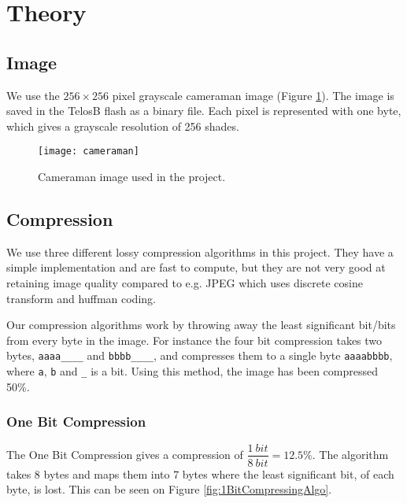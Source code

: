 \section{Theory}

\subsection{Image}
We use the $256 \times 256$ pixel grayscale cameraman image (Figure \ref{fig:image_cameraman}). The image is saved in the TelosB flash as a binary file. Each pixel is represented with one byte, which gives a grayscale resolution of 256 shades.

\begin{figure}[ht!]
\centering
\texttt{[image: cameraman]}
\caption{Cameraman image used in the project.}
\label{fig:image_cameraman}
\end{figure}

\subsection{Compression}

We use three different lossy compression algorithms in this project.
They have a simple implementation and are fast to compute, but they are not very good at retaining image quality compared to e.g. JPEG which uses discrete cosine transform and huffman coding.

Our compression algorithms work by throwing away the least significant bit/bits from every byte in the image.
For instance the four bit compression takes two bytes, \texttt{aaaa\_\_\_\_} and \texttt{bbbb\_\_\_\_}, and compresses them to a single byte \texttt{aaaabbbb}, where \texttt{a}, \texttt{b} and \texttt{\_} is a bit. Using this method, the image has been compressed 50\%.


\subsubsection{One Bit Compression} %
\label{sub:one_bit_compression}
\FloatBarrier

The One Bit Compression gives a compression of $\dfrac{1\ bit}{8\ bit} = 12.5\%$.
The algorithm takes 8 bytes and maps them into 7 bytes where the least significant bit, of each byte, is lost.
This can be seen on Figure \ref{fig:1BitCompressingAlgo}.

